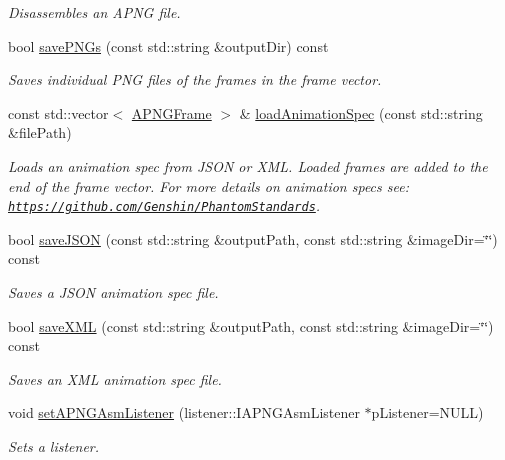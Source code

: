 \begin{DoxyCompactItemize}
\begin{DoxyCompactList}\small\item\em Disassembles an A\-P\-N\-G file. \end{DoxyCompactList}\item 
bool \hyperlink{classapngasm_1_1APNGAsm_a59ebac9f6db6973bc8e5b5d05e72586f}{save\-P\-N\-Gs} (const std\-::string \&output\-Dir) const 
\begin{DoxyCompactList}\small\item\em Saves individual P\-N\-G files of the frames in the frame vector. \end{DoxyCompactList}\item 
const std\-::vector$<$ \hyperlink{classapngasm_1_1APNGFrame}{A\-P\-N\-G\-Frame} $>$ \& \hyperlink{classapngasm_1_1APNGAsm_acf09916f78025c714a205142cdae1349}{load\-Animation\-Spec} (const std\-::string \&file\-Path)
\begin{DoxyCompactList}\small\item\em Loads an animation spec from J\-S\-O\-N or X\-M\-L. Loaded frames are added to the end of the frame vector. For more details on animation specs see\-: \href{https://github.com/Genshin/PhantomStandards}{\tt https\-://github.\-com/\-Genshin/\-Phantom\-Standards}. \end{DoxyCompactList}\item 
bool \hyperlink{classapngasm_1_1APNGAsm_abdb6681c9013cf41a026a4dd48331557}{save\-J\-S\-O\-N} (const std\-::string \&output\-Path, const std\-::string \&image\-Dir=\char`\"{}\char`\"{}) const 
\begin{DoxyCompactList}\small\item\em Saves a J\-S\-O\-N animation spec file. \end{DoxyCompactList}\item 
bool \hyperlink{classapngasm_1_1APNGAsm_a978d3036659830a811e6b6572c84ee10}{save\-X\-M\-L} (const std\-::string \&output\-Path, const std\-::string \&image\-Dir=\char`\"{}\char`\"{}) const 
\begin{DoxyCompactList}\small\item\em Saves an X\-M\-L animation spec file. \end{DoxyCompactList}\item 
void \hyperlink{classapngasm_1_1APNGAsm_a9077ec06f0f271d1719e868b93a3a703}{set\-A\-P\-N\-G\-Asm\-Listener} (listener\-::\-I\-A\-P\-N\-G\-Asm\-Listener $\ast$p\-Listener=N\-U\-L\-L)
\begin{DoxyCompactList}\small\item\em Sets a listener. \end{DoxyCompactList}\item 

\end{DoxyCompactItemize}
